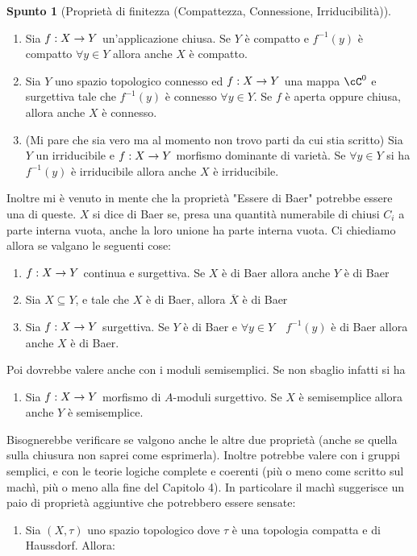 \documentclass[a4paper,NoNotes,GeneralMath]{stdmdoc}
\theoremstyle{definition}
\newtheorem{spunto}{Spunto}
\begin{document}
\begin{spunto}[Proprietà di finitezza (Compattezza, Connessione, Irriducibilità)]
\begin{enumerate}
\begin{itemize}
				\end{itemize}
				\hrule
			\item Sia $f: X \rightarrow Y$ un'applicazione chiusa. Se $Y$ è compatto e $f^{-1}(y)$ è compatto $\forall y \in Y$ allora anche $X$ è compatto.
			\item Sia $Y$ uno spazio topologico connesso ed $f: X \rightarrow Y$ una mappa $\cC^0$ e surgettiva tale che $f^{-1}(y)$ è connesso $\forall y \in Y$. Se $f$ è aperta oppure chiusa, allora anche $X$ è connesso.
			\item (Mi pare che sia vero ma al momento non trovo parti da cui stia scritto) Sia $Y$ un irriducibile e $f: X \rightarrow Y$ morfismo dominante di varietà. Se $\forall y \in Y$ si ha $f^{-1}(y)$ è irriducibile allora anche $X$ è irriducibile.
		\end{enumerate}
		Inoltre mi è venuto in mente che la proprietà "Essere di Baer" potrebbe essere una di queste. $X$ si dice di Baer se, presa una quantità numerabile di chiusi $C_i$ a parte interna vuota, anche la loro unione ha parte interna vuota. Ci chiediamo allora se valgano le seguenti cose:
		\begin{enumerate}
			\item $f: X \rightarrow Y$ continua e surgettiva. Se $X$ è di Baer allora anche $Y$ è di Baer
			\item Sia $X \subseteq Y$, e tale che $X$ è di Baer, allora $\overline{X}$ è di Baer
			\item Sia $f: X \rightarrow Y$ surgettiva. Se $Y$ è di Baer e $\forall y \in Y \quad f^{-1}(y)$ è di Baer allora anche $X$ è di Baer.
		\end{enumerate}
		Poi dovrebbe valere anche con i moduli semisemplici. Se non sbaglio infatti si ha
		\begin{enumerate}
			\item Sia $f: X \rightarrow Y$ morfismo di $A$-moduli surgettivo. Se $X$ è semisemplice allora anche $Y$ è semisemplice.
		\end{enumerate}
		Bisognerebbe verificare se valgono anche le altre due proprietà (anche se quella sulla chiusura non saprei come esprimerla).
		Inoltre potrebbe valere con i gruppi semplici, e con le teorie logiche complete e coerenti (più o meno come scritto sul machì, più o meno alla fine del Capitolo 4).
		In particolare il machì suggerisce un paio di proprietà aggiuntive che potrebbero essere sensate:
		\begin{enumerate}
			\item Sia $(X, \tau)$ uno spazio topologico dove $\tau$ è una topologia compatta e di Haussdorf. Allora:

\end{enumerate}
\end{spunto}
\end{document}
